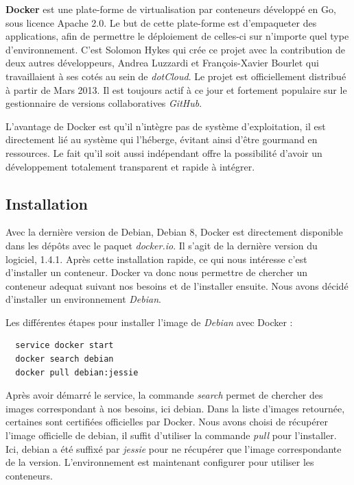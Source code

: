 \documentclass[12pt,a4paper]{article}
\begin{document}
\newpage

\textbf{Docker} est une plate-forme de virtualisation par conteneurs développé en Go, sous licence Apache 2.0. Le but de cette plate-forme est d'empaqueter des applications, afin de permettre le déploiement de celles-ci sur n'importe quel type d'environnement. C'est Solomon Hykes qui crée ce projet avec la contribution de deux autres développeurs, Andrea Luzzardi et François-Xavier Bourlet qui travaillaient à ses cotés au sein de \textit{dotCloud}. Le projet est officiellement distribué à partir de Mars 2013. Il est toujours actif à ce jour et fortement populaire sur le gestionnaire de versions collaboratives \textit{GitHub}.

L'avantage de Docker est qu'il n'intègre pas de système d'exploitation, il est directement lié au système qui l'héberge, évitant ainsi d'être gourmand en ressources. Le fait qu'il soit aussi indépendant offre la possibilité d'avoir un développement totalement transparent et rapide à intégrer. 

\subsection{Installation}
Avec la dernière version de Debian, Debian 8, Docker est directement disponible dans les dépôts avec le paquet \textit{docker.io}. Il s'agit de la dernière version du logiciel, 1.4.1. Après cette installation rapide, ce qui nous intéresse c'est d'installer un conteneur. Docker va donc nous permettre de chercher un conteneur adequat suivant nos besoins et de l'installer ensuite. Nous avons décidé d'installer un environnement \textit{Debian}.

Les différentes étapes pour installer l'image de \textit{Debian} avec Docker :
\begin{lstlisting}
  service docker start
  docker search debian
  docker pull debian:jessie
\end{lstlisting}

Après avoir démarré le service, la commande \textit{search} permet de chercher des images correspondant à nos besoins, ici debian. Dans la liste d'images retournée, certaines sont certifiées officielles par Docker. Nous avons choisi de récupérer l'image officielle de debian, il suffit d'utiliser la commande \textit{pull} pour l'installer. Ici, debian a été suffixé par \textit{jessie} pour ne récupérer que l'image correspondante de la version. L'environnement est maintenant configurer pour utiliser les conteneurs.
\end{document}

